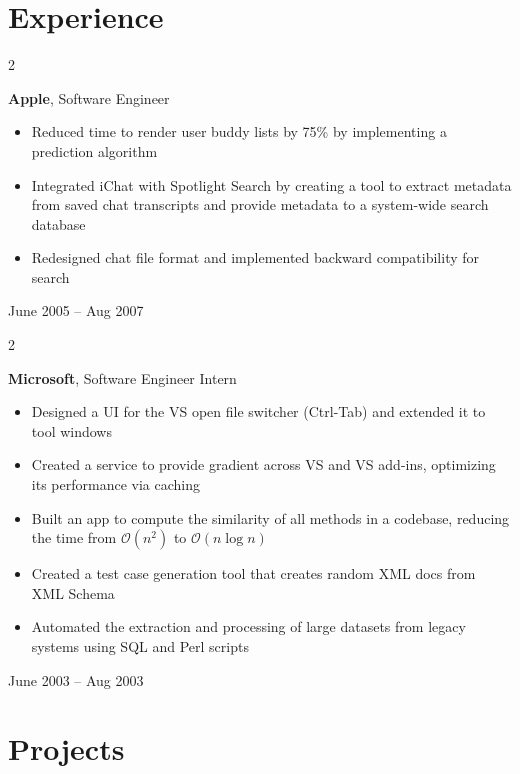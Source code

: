 \documentclass[10pt, letterpaper]{article}
\newenvironment{highlights}{
    \begin{itemize}[
        topsep=0.10 cm,
        parsep=0.10 cm,
        partopsep=0pt,
        itemsep=0pt,
        leftmargin=0.4 cm + 10pt
    ]
}{
    \end{itemize}
}
\newenvironment{twocolentry}[2][]{
    \onecolentry
    \def\secondColumn{#2}
    \setcolumnwidth{\fill, 4.5 cm}
    \begin{paracol}{2}
}{
    \switchcolumn \raggedleft \secondColumn
    \end{paracol}
    \endonecolentry
}
\begin{document}
\section{Experience}
\begin{twocolentry}{    
    June 2005 – Aug 2007
}
    \textbf{Apple}, Software Engineer
    \begin{highlights}
        \item Reduced time to render user buddy lists by 75\% by implementing a prediction algorithm
        \item Integrated iChat with Spotlight Search by creating a tool to extract metadata from saved chat transcripts and provide metadata to a system-wide search database
        \item Redesigned chat file format and implemented backward compatibility for search
    \end{highlights}
\end{twocolentry}


\vspace{0.2 cm}

\begin{twocolentry}{
    June 2003 – Aug 2003
}
    \textbf{Microsoft}, Software Engineer Intern
    \begin{highlights}
        \item Designed a UI for the VS open file switcher (Ctrl-Tab) and extended it to tool windows
        \item Created a service to provide gradient across VS and VS add-ins, optimizing its performance via caching
        \item Built an app to compute the similarity of all methods in a codebase, reducing the time from $\mathcal{O}(n^2)$ to $\mathcal{O}(n \log n)$
        \item Created a test case generation tool that creates random XML docs from XML Schema
        \item Automated the extraction and processing of large datasets from legacy systems using SQL and Perl scripts
    \end{highlights}
\end{twocolentry}





    
    \section{Projects}
\end{document}
